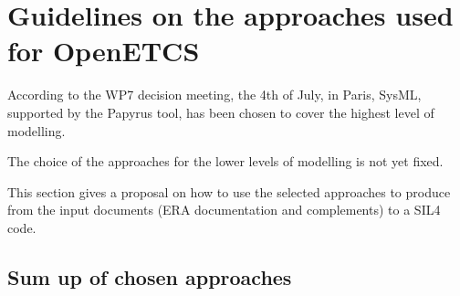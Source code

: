 
\section{Guidelines on the approaches used for OpenETCS}


\begin{comment}
This section will be written for the final version of the document, after the approach and tools tio  use during the project will be selected.
\end{comment}

According to  the WP7 decision meeting, the 4th of July, in Paris, SysML, supported by the Papyrus tool,  has been chosen to  cover the highest level of modelling.

The choice of the approaches for the lower levels of modelling is not yet fixed.

This section gives a proposal on how to use the selected approaches to produce from the input documents (ERA documentation and complements)  to a SIL4 code.

\subsection{Sum up of chosen approaches}
\begin{comment}
list of chosen approaches, and for which activities they are used
\end{comment}
